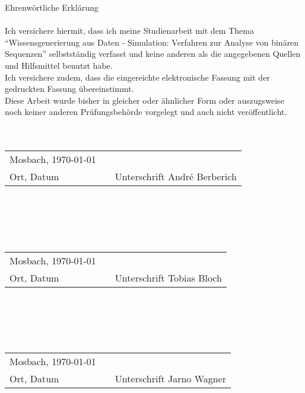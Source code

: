 {\huge Ehrenwörtliche Erklärung}
\\
\\
Ich versichere hiermit, dass ich meine Studienarbeit mit dem Thema \enquote{Wissensgenerierung aus Daten - Simulation: Verfahren zur Analyse von binären Sequenzen} selbstständig verfasst und keine anderen als die angegebenen Quellen und Hilfsmittel benutzt habe.
\\
Ich versichere zudem, dass die eingereichte elektronische Fassung mit der gedruckten Fassung übereinstimmt.
\\
Diese Arbeit wurde bisher in gleicher oder ähnlicher Form oder auszugsweise noch keiner anderen Prüfungsbehörde vorgelegt und auch nicht veröffentlicht.
\\
\\
\\
\begin{tabular}{lp{2em}l} 
 Mosbach, \today && \hspace{4cm} \\\cline{1-1}\cline{3-3} 
 Ort, Datum     && Unterschrift André Berberich
\end{tabular}
\\
\\
\\
\\
\begin{tabular}{lp{2em}l} 
	Mosbach, \today && \hspace{4cm} \\\cline{1-1}\cline{3-3} 
	Ort, Datum     && Unterschrift Tobias Bloch
\end{tabular}
\\
\\
\\
\\
\begin{tabular}{lp{2em}l} 
	Mosbach, \today && \hspace{4cm} \\\cline{1-1}\cline{3-3} 
	Ort, Datum     && Unterschrift Jarno Wagner
\end{tabular}
\newpage
 